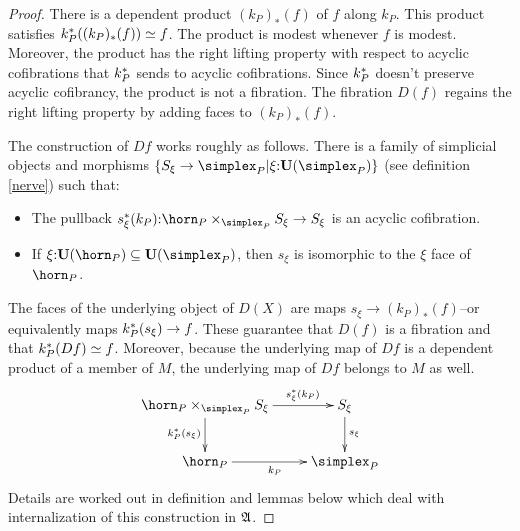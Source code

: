 \documentclass[csh.tex]{subfiles}
\begin{document}
\newcommand\dsum[1]{\Sigma_{#1}}
\begin{proof}
There is a dependent product $(k_P)_*(f)$ of $f$ along $k_P$. This product satisfies $k_P^*((k_P)_*(f))\simeq f$. The product is modest whenever $f$ is modest. Moreover, the product has the right lifting property with respect to acyclic cofibrations that $k_P^*$ sends to acyclic cofibrations. Since $k_P^*$ doesn't preserve acyclic cofibrancy, the product is not a fibration. The fibration $D(f)$ regains the right lifting property by adding faces to $(k_P)_*(f)$.

The construction of $Df$ works roughly as follows. 
There is a family of simplicial objects and morphisms $\set{S_\xi\to \simplex_P|\xi\of\base(\simplex_P)}$ (see definition \ref{nerve})
such that:
\begin{itemize}
\item The pullback $s_\xi\ri(k_P)\of \horn_P\times_{\simplex_P}S_\xi \to S_\xi$ is an acyclic cofibration. %
\item If $\xi\of\base(\horn_P)\subseteq \base(\simplex_P)$, then $s_\xi$ is isomorphic to the $\xi$ face of $\horn_P$. %
\end{itemize}
The faces of the underlying object of $D(X)$ are maps $s_\xi\to(k_P)_*(f)$--or equivalently maps $k_P^*(s_\xi)\to f$. %
These guarantee that $D(f)$ is a fibration and that $k_P^*(Df) \simeq f$. %
Moreover, because the underlying map of $Df$ is a dependent product of a member of $M$, the underlying map of $Df$ belongs to $M$ as well. %
\[\xymatrix{
\horn_P\times_{\simplex_P}S_\xi\ar[r]^(.7){s_\xi\ri(k_P)}\ar[d]_{k_P\ri(s_\xi)} & S_\xi\ar[d]^{s_\xi}\\
\horn_P \ar[r]_{k_P} & \simplex_P
}\]
Details are worked out in definition and lemmas below which deal with internalization of this construction in $\mathfrak A$.
\end{proof}
\end{document}
